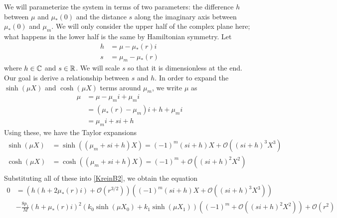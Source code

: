 \documentclass[thesis.tex]{subfiles}
\begin{document}
We will parameterize the system in terms of two parameters: the difference $h$ between $\mu$ and $\mu_*(0)$ and the distance $s$ along the imaginary axis between $\mu_*(0)$ and $\mu_m$. We will only consider the upper half of the complex plane here; what happens in the lower half is the same by Hamiltonian symmetry. Let 
\begin{align*}
h &= \mu - \mu_*(r) i \\
s &= \mu_m - \mu_*(r)
\end{align*}
where $h \in \mathbb{C}$ and $s \in \mathbb{R}$. We will scale $s$ so that it is dimensionless at the end. Our goal is derive a relationship between $s$ and $h$. In order to expand the $\sinh(\mu X)$ and $\cosh(\mu X)$ terms around $\mu_m$, we write $\mu$ as
\begin{align*}
\mu &= \mu - \mu_m i + \mu_m i \\
&= (\mu_*(r) - \mu_m)i + h + \mu_m i \\
&= \mu_m i + s i + h
\end{align*}
Using these, we have the Taylor expansions
\begin{align*}
\sinh(\mu X) &= \sinh((\mu_m + s i + h)X)
= (-1)^m(s i + h)X + \mathcal{O}\left( (s i +h)^3 X^3 \right) \\
\cosh(\mu X) &= \cosh((\mu_m + s i + h)X)
= (-1)^m + \mathcal{O}\left( (s i + h)^2 X^2 \right) \\
\end{align*}
Substituting all of these into \cref{KreinB2}, we obtain the equation
\begin{equation}\label{KreinB3}
\begin{aligned}
0 &= \left( h ( h + 2 \mu_*(r) i) +  \mathcal{O}( r^{3/2} )\right) \left( (-1)^m(s i + h)X + \mathcal{O}\left( (si+h)^3 X^3 \right)  \right) \\
&-\frac{8 p_1}{M} ( h + \mu_*(r) i)^2 ( k_0\sinh(\mu X_0) + k_1 \sinh(\mu X_1) ) \left( (-1)^m + \mathcal{O}\left( (s i +h)^2 X^2 \right) \right) + \mathcal{O}( r^2 )
\end{aligned}
\end{equation}
\end{document}
